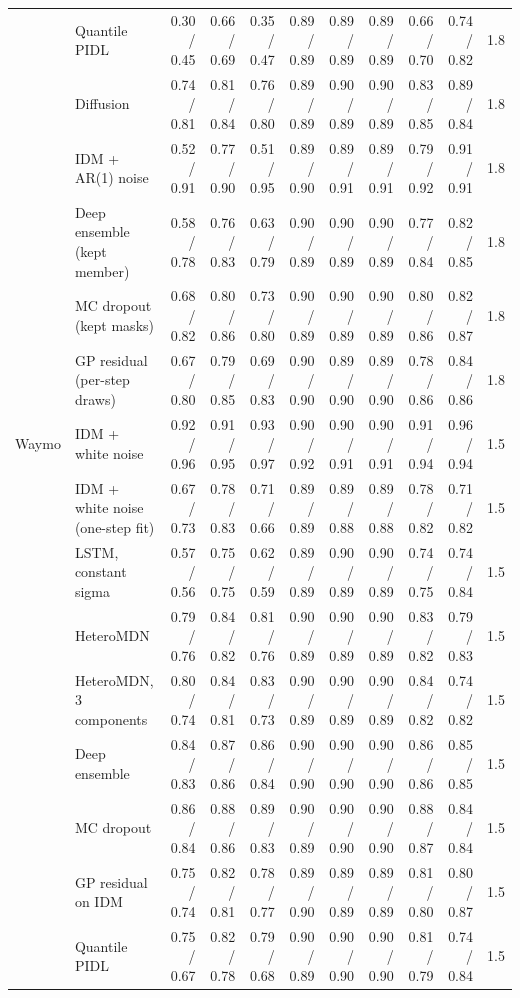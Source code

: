 \begin{longtable}{llrrrrrrrrr}
 & Quantile PIDL & 0.30 / 0.45 & 0.66 / 0.69 & 0.35 / 0.47 & 0.89 / 0.89 & 0.89 / 0.89 & 0.89 / 0.89 & 0.66 / 0.70 & 0.74 / 0.82 & 1.8 \\
 & Diffusion & 0.74 / 0.81 & 0.81 / 0.84 & 0.76 / 0.80 & 0.89 / 0.89 & 0.90 / 0.89 & 0.90 / 0.89 & 0.83 / 0.85 & 0.89 / 0.84 & 1.8 \\
 & IDM + AR(1) noise & 0.52 / 0.91 & 0.77 / 0.90 & 0.51 / 0.95 & 0.89 / 0.90 & 0.89 / 0.91 & 0.89 / 0.91 & 0.79 / 0.92 & 0.91 / 0.91 & 1.8 \\
 & Deep ensemble (kept member) & 0.58 / 0.78 & 0.76 / 0.83 & 0.63 / 0.79 & 0.90 / 0.89 & 0.90 / 0.89 & 0.90 / 0.89 & 0.77 / 0.84 & 0.82 / 0.85 & 1.8 \\
 & MC dropout (kept masks) & 0.68 / 0.82 & 0.80 / 0.86 & 0.73 / 0.80 & 0.90 / 0.89 & 0.90 / 0.89 & 0.90 / 0.89 & 0.80 / 0.86 & 0.82 / 0.87 & 1.8 \\
 & GP residual (per-step draws) & 0.67 / 0.80 & 0.79 / 0.85 & 0.69 / 0.83 & 0.90 / 0.90 & 0.89 / 0.90 & 0.89 / 0.90 & 0.78 / 0.86 & 0.84 / 0.86 & 1.8 \\
\midrule
Waymo & IDM + white noise & 0.92 / 0.96 & 0.91 / 0.95 & 0.93 / 0.97 & 0.90 / 0.92 & 0.90 / 0.91 & 0.90 / 0.91 & 0.91 / 0.94 & 0.96 / 0.94 & 1.5 \\
 & IDM + white noise (one-step fit) & 0.67 / 0.73 & 0.78 / 0.83 & 0.71 / 0.66 & 0.89 / 0.89 & 0.89 / 0.88 & 0.89 / 0.88 & 0.78 / 0.82 & 0.71 / 0.82 & 1.5 \\
 & LSTM, constant sigma & 0.57 / 0.56 & 0.75 / 0.75 & 0.62 / 0.59 & 0.89 / 0.89 & 0.90 / 0.89 & 0.90 / 0.89 & 0.74 / 0.75 & 0.74 / 0.84 & 1.5 \\
 & HeteroMDN & 0.79 / 0.76 & 0.84 / 0.82 & 0.81 / 0.76 & 0.90 / 0.89 & 0.90 / 0.89 & 0.90 / 0.89 & 0.83 / 0.82 & 0.79 / 0.83 & 1.5 \\
 & HeteroMDN, 3 components & 0.80 / 0.74 & 0.84 / 0.81 & 0.83 / 0.73 & 0.90 / 0.89 & 0.90 / 0.89 & 0.90 / 0.89 & 0.84 / 0.82 & 0.74 / 0.82 & 1.5 \\
 & Deep ensemble & 0.84 / 0.83 & 0.87 / 0.86 & 0.86 / 0.84 & 0.90 / 0.90 & 0.90 / 0.90 & 0.90 / 0.90 & 0.86 / 0.86 & 0.85 / 0.85 & 1.5 \\
 & MC dropout & 0.86 / 0.84 & 0.88 / 0.86 & 0.89 / 0.83 & 0.90 / 0.89 & 0.90 / 0.90 & 0.90 / 0.90 & 0.88 / 0.87 & 0.84 / 0.84 & 1.5 \\
 & GP residual on IDM & 0.75 / 0.74 & 0.82 / 0.81 & 0.78 / 0.77 & 0.89 / 0.90 & 0.89 / 0.89 & 0.89 / 0.89 & 0.81 / 0.80 & 0.80 / 0.87 & 1.5 \\
 & Quantile PIDL & 0.75 / 0.67 & 0.82 / 0.78 & 0.79 / 0.68 & 0.90 / 0.89 & 0.90 / 0.90 & 0.90 / 0.90 & 0.81 / 0.79 & 0.74 / 0.84 & 1.5 \\

\end{longtable}
